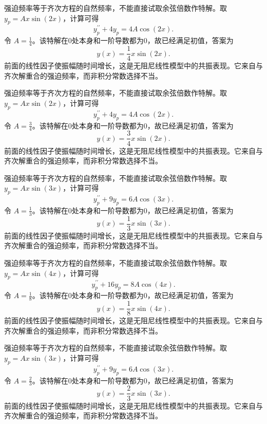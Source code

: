 \documentclass[12pt,fontset=fandol]{ctexart}
\begin{document}
\begin{solve}\label{ans:c23q20}
强迫频率等于齐次方程的自然频率，不能直接试取余弦倍数作特解。取 $y_p=A x\sin(2x)$，计算可得
\[
y_p^{\prime\prime}+4y_p=4A\cos(2x).
\]
令 $A=\frac{1}{4}$。该特解在0处本身和一阶导数都为0，故已经满足初值，答案为
\[
y(x)=\frac{1}{4}x\sin(2x).
\]
前面的线性因子使振幅随时间增长，这是无阻尼线性模型中的共振表现。它来自与齐次解重合的强迫频率，而非积分常数选择不当。
\end{solve}

\begin{solve}\label{ans:c23q21}
强迫频率等于齐次方程的自然频率，不能直接试取余弦倍数作特解。取 $y_p=A x\sin(2x)$，计算可得
\[
y_p^{\prime\prime}+4y_p=4A\cos(2x).
\]
令 $A=\frac{3}{4}$。该特解在0处本身和一阶导数都为0，故已经满足初值，答案为
\[
y(x)=\frac{3}{4}x\sin(2x).
\]
前面的线性因子使振幅随时间增长，这是无阻尼线性模型中的共振表现。它来自与齐次解重合的强迫频率，而非积分常数选择不当。
\end{solve}

\begin{solve}\label{ans:c23q22}
强迫频率等于齐次方程的自然频率，不能直接试取余弦倍数作特解。取 $y_p=A x\sin(3x)$，计算可得
\[
y_p^{\prime\prime}+9y_p=6A\cos(3x).
\]
令 $A=\frac{1}{3}$。该特解在0处本身和一阶导数都为0，故已经满足初值，答案为
\[
y(x)=\frac{1}{3}x\sin(3x).
\]
前面的线性因子使振幅随时间增长，这是无阻尼线性模型中的共振表现。它来自与齐次解重合的强迫频率，而非积分常数选择不当。
\end{solve}

\begin{solve}\label{ans:c23q23}
强迫频率等于齐次方程的自然频率，不能直接试取余弦倍数作特解。取 $y_p=A x\sin(4x)$，计算可得
\[
y_p^{\prime\prime}+16y_p=8A\cos(4x).
\]
令 $A=\frac{1}{8}$。该特解在0处本身和一阶导数都为0，故已经满足初值，答案为
\[
y(x)=\frac{1}{8}x\sin(4x).
\]
前面的线性因子使振幅随时间增长，这是无阻尼线性模型中的共振表现。它来自与齐次解重合的强迫频率，而非积分常数选择不当。
\end{solve}

\begin{solve}\label{ans:c23q24}
强迫频率等于齐次方程的自然频率，不能直接试取余弦倍数作特解。取 $y_p=A x\sin(3x)$，计算可得
\[
y_p^{\prime\prime}+9y_p=6A\cos(3x).
\]
令 $A=\frac{2}{3}$。该特解在0处本身和一阶导数都为0，故已经满足初值，答案为
\[
y(x)=\frac{2}{3}x\sin(3x).
\]
前面的线性因子使振幅随时间增长，这是无阻尼线性模型中的共振表现。它来自与齐次解重合的强迫频率，而非积分常数选择不当。
\end{solve}
\end{document}
